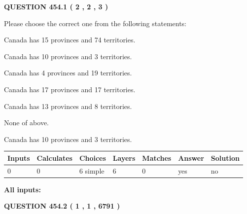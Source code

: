 \documentclass[12pt]{article}
\begin{document}
\vspace{0.2in}
  
{\textbf{\Large{QUESTION
454.1 
 ( 2 , 2 , 3 )
}}}
  
  
Please choose the correct one from the following statements:
 
 
Canada has  15 provinces and  74 territories.
 
 
Canada has 10  provinces and 3 territories.
 
 
Canada has   4 provinces and  19 territories.
 
 
Canada has  17 provinces and  17 territories.
 
 
Canada has  13 provinces and  8 territories.
 
 
 None of above.
 
 
\noindent{}
 
 
Canada has 10  provinces and 3 territories.
 
 
\noindent{}
 
 
   
   
   
   
\noindent\begin{tabular}{|l|l|l|l|l|l|l|}
 \hline
Inputs & Calculates & Choices & Layers & Matches & Answer & Solution \\ \hline
 0  & 
 0  & 
 6
  simple  
  & 
 6  & 
 0  & 
  yes & 
  no 
  \\ \hline
 \end{tabular}
   
   
   
   
\noindent{}
   
   
   
   
\noindent\vspace{0.1in}\hspace{-0.08in} {\textbf{\Large{All inputs: }}}
   
   
  
\vspace{0.2in}
  
{\textbf{\Large{QUESTION
454.2 
 ( 1 , 1 , 6791 )
}}}
  
\end{document}
